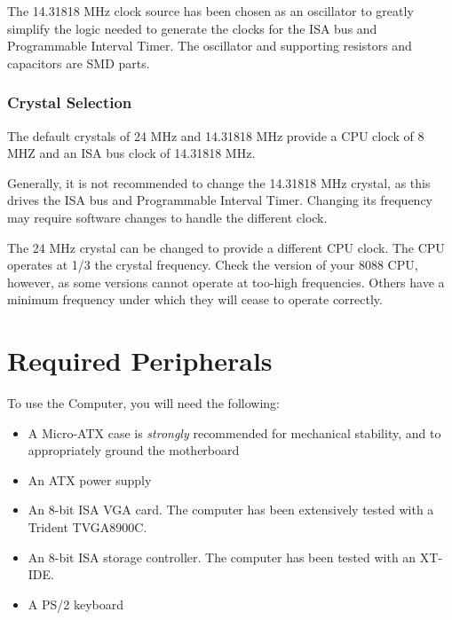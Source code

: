 \documentclass[twoside,10pt,letterpaper]{refart}
\begin{document}
The 14.31818 MHz clock source has been chosen as an oscillator to greatly simplify the
logic needed to generate the clocks for the ISA bus and Programmable Interval Timer. The
oscillator and supporting resistors and capacitors are SMD parts.

\subsubsection{Crystal Selection}
The default crystals of 24 MHz and 14.31818 MHz provide a CPU clock of 8 MHZ and an ISA
bus clock of 14.31818 MHz.

Generally, it is not recommended to change the 14.31818 MHz crystal, as this drives the
ISA bus and Programmable Interval Timer. Changing its frequency may require software changes
to handle the different clock.

The 24 MHz crystal can be changed to provide a different CPU clock. The CPU operates at
1/3 the crystal frequency. Check the version of your 8088 CPU, however, as some versions
cannot operate at too-high frequencies. Others have a minimum frequency under which they
will cease to operate correctly.

\section{Required Peripherals}
To use the  Computer, you will need the following:
\begin{itemize}
    \item A Micro-ATX case is \emph{strongly} recommended for mechanical stability, and to appropriately ground the motherboard
    \item An ATX power supply
    \item An 8-bit ISA VGA card. The computer has been extensively tested with a Trident TVGA8900C.
    \item An 8-bit ISA storage controller. The computer has been tested with an XT-IDE.
    \item A PS/2 keyboard
\end{itemize}
\end{document}
